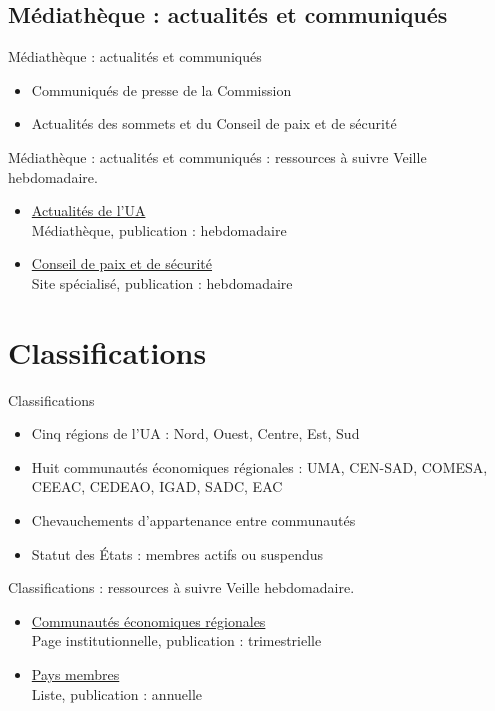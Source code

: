 \documentclass[aspectratio=169,11pt]{beamer}
\begin{document}
\subsection{Médiathèque : actualités et communiqués}
\begin{frame}{Médiathèque : actualités et communiqués}
\begin{itemize}
\item Communiqués de presse de la Commission
\item Actualités des sommets et du Conseil de paix et de sécurité
\end{itemize}
\end{frame}

\begin{frame}{Médiathèque : actualités et communiqués : ressources à suivre}
\small
Veille hebdomadaire.
\begin{itemize}
\item \href{https://au.int/en/pressreleases}{Actualités de l'UA}\\{\footnotesize Médiathèque, publication : hebdomadaire}
\item \href{https://www.peaceau.org}{Conseil de paix et de sécurité}\\{\footnotesize Site spécialisé, publication : hebdomadaire}
\end{itemize}
\end{frame}

\section{Classifications}
\begin{frame}{Classifications}
\begin{itemize}
\item Cinq régions de l'UA : Nord, Ouest, Centre, Est, Sud
\item Huit communautés économiques régionales : UMA, CEN-SAD, COMESA, CEEAC, CEDEAO, IGAD, SADC, EAC
\item Chevauchements d'appartenance entre communautés
\item Statut des États : membres actifs ou suspendus
\end{itemize}
\end{frame}

\begin{frame}{Classifications : ressources à suivre}
\small
Veille hebdomadaire.
\begin{itemize}
\item \href{https://au.int/en/recs}{Communautés économiques régionales}\\{\footnotesize Page institutionnelle, publication : trimestrielle}
\item \href{https://au.int/en/member_states/countryprofiles2}{Pays membres}\\{\footnotesize Liste, publication : annuelle}
\end{itemize}
\end{frame}
\end{document}
